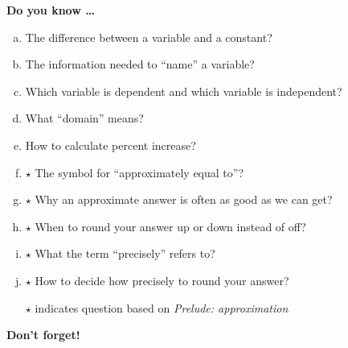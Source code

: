 \newpage



\bigskip

\noindent \textbf{Do you know \ldots} %

\begin{enumerate} [(a)]
\item The difference between a variable and a constant?
\item The information needed to ``name'' a variable?
\item Which variable is dependent and which variable is independent? 
\item What ``domain'' means?
\item How to calculate percent increase? 
\item $\star$ The symbol for ``approximately equal to''? 
\item $\star$ Why an approximate answer is often as good as we can get? 
\item $\star$ When to round your answer up or down instead of off? 
\item $\star$ What the term ``precisely'' refers to? 
\item $\star$ How to decide how precisely to round your answer?

\hfill  $\star$ indicates question based on \emph{Prelude:  approximation}
\end{enumerate}


\noindent \textbf{Don't forget!}

